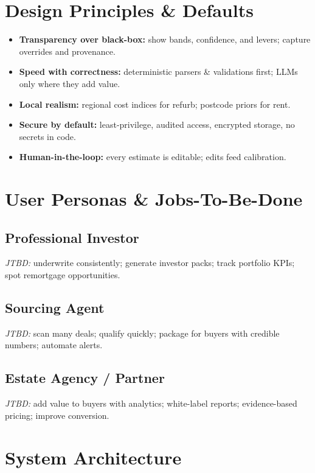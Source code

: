 \documentclass[12pt,a4paper]{article}
\begin{document}
\section{Design Principles \& Defaults}
\begin{itemize}[leftmargin=1.5em]
  \item \textbf{Transparency over black-box:} show bands, confidence, and levers; capture overrides and provenance.
  \item \textbf{Speed with correctness:} deterministic parsers \& validations first; LLMs only where they add value.
  \item \textbf{Local realism:} regional cost indices for refurb; postcode priors for rent.
  \item \textbf{Secure by default:} least-privilege, audited access, encrypted storage, no secrets in code.
  \item \textbf{Human-in-the-loop:} every estimate is editable; edits feed calibration.
\end{itemize}

\section{User Personas \& Jobs-To-Be-Done}
\subsection{Professional Investor}
\textit{JTBD:} underwrite consistently; generate investor packs; track portfolio KPIs; spot remortgage opportunities.

\subsection{Sourcing Agent}
\textit{JTBD:} scan many deals; qualify quickly; package for buyers with credible numbers; automate alerts.

\subsection{Estate Agency / Partner}
\textit{JTBD:} add value to buyers with analytics; white-label reports; evidence-based pricing; improve conversion.

\section{System Architecture}
\end{document}
